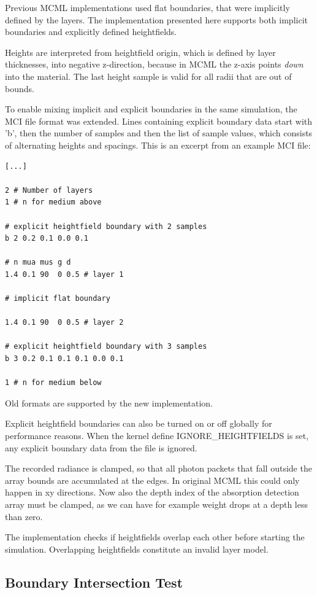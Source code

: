 \documentclass[]{article}
\begin{document}
Previous MCML implementations used flat boundaries, that were implicitly defined by the layers. The implementation presented here supports both implicit boundaries and explicitly defined heightfields.

Heights are interpreted from heightfield origin, which is defined by layer thicknesses, into negative z-direction, because in MCML the z-axis points \emph{down} into the material. The last height sample is valid for all radii that are out of bounds.

To enable mixing implicit and explicit boundaries in the same simulation, the MCI file format was extended. Lines containing explicit boundary data start with 'b', then the number of samples and then the list of sample values, which consists of alternating heights and spacings. This is an excerpt from an example MCI file:

\begin{lstlisting}
[...]

2 # Number of layers
1 # n for medium above

# explicit heightfield boundary with 2 samples
b 2 0.2 0.1 0.0 0.1

# n mua mus g d
1.4 0.1 90  0 0.5 # layer 1

# implicit flat boundary

1.4 0.1 90  0 0.5 # layer 2

# explicit heightfield boundary with 3 samples
b 3 0.2 0.1 0.1 0.1 0.0 0.1

1 # n for medium below
\end{lstlisting}

Old formats are supported by the new implementation.

Explicit heightfield boundaries can also be turned on or off globally for performance reasons. When the kernel define IGNORE\_HEIGHTFIELDS is set, any explicit boundary data from the file is ignored.

The recorded radiance is clamped, so that all photon packets that fall outside the array bounds are accumulated at the edges. In original MCML this could only happen in xy directions. Now also the depth index of the absorption detection array must be clamped, as we can have for example weight drops at a depth less than zero.

The implementation checks if heightfields overlap each other before starting the simulation. Overlapping heightfields constitute an invalid layer model.

\subsection{Boundary Intersection Test}
\label{impl:intersection}
\end{document}
